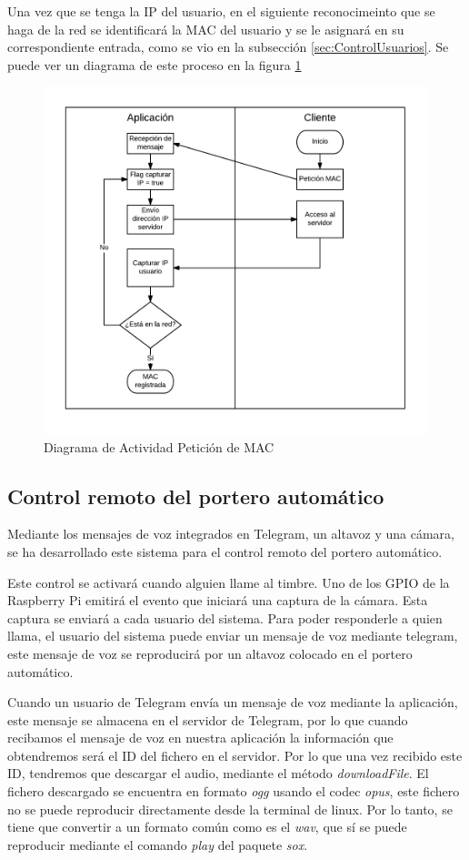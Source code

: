 \documentclass[10pt,journal,compsoc]{IEEEtran}
\begin{document}
Una vez que se tenga la IP del usuario, en el siguiente reconocimeinto que se 
haga de la red se identificará la MAC del usuario y se le asignará en su 
correspondiente entrada, como se vio en la subsección \ref{sec:ControlUsuarios}. 
Se puede ver un diagrama de este proceso en la figura \ref{fig:ActMAC}

\begin{figure}[h]
\centering
\includegraphics[scale=0.5]{ActMAC}
\caption{Diagrama de Actividad Petición de MAC}
\label{fig:ActMAC}
\end{figure}

\subsection{Control remoto del portero automático}
Mediante los mensajes de voz integrados en Telegram, un altavoz y una cámara, se  
ha desarrollado este sistema para el control remoto del portero automático. 

Este control se activará cuando alguien llame al timbre. Uno de los GPIO de la 
Raspberry Pi emitirá el evento que iniciará una captura de la cámara. Esta 
captura se enviará a cada usuario del sistema. 
Para poder responderle a quien llama, el usuario del sistema puede enviar un mensaje de voz mediante
telegram, este mensaje de voz se reproducirá por un altavoz colocado en el portero automático.

Cuando un usuario de Telegram envía un mensaje de voz mediante la aplicación, 
este mensaje se almacena en el servidor de Telegram, por lo que cuando recibamos el mensaje 
de voz en nuestra aplicación la información que obtendremos será el ID del 
fichero en el servidor. Por lo que una vez recibido este ID, tendremos que 
descargar el audio, mediante el método \textit{downloadFile}.
El fichero descargado se encuentra en formato \textit{ogg} usando el codec 
\textit{opus}, este fichero no se puede reproducir directamente desde la 
terminal de linux. Por lo tanto, se tiene que convertir a un formato común como es 
el \textit{wav}, que sí se puede reproducir mediante el comando \textit{play} del paquete \textit{sox}.
\end{document}
